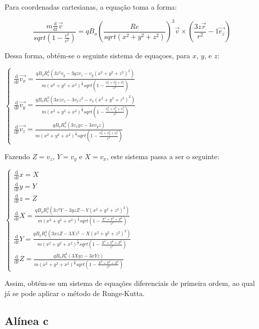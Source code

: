 \documentclass{article}
\begin{document}
\begin{multicols}{2}
Para coordenadas cartesianas, a equação toma a forma:

\begin{equation}
  \frac{m\frac{\mathrm{d} }{\mathrm{d} t}\vec{v}}{sqrt(1-\frac{v^2}{c^2})} = qB_o(\frac{Re}{sqrt(x^2+y^2+z^2)})^3\vec{v}\times(\frac{3z\vec{r}}{r^2}-1\vec{e_z})
\end{equation}

Dessa forma, obtém-se o seguinte sistema de equaçoes, para $x$, $y$, e $z$:

$\left\{\begin{matrix}
\frac{\mathrm{d} }{\mathrm{d} t}\vec{v_x}= \frac{qB_oR_e^3(3z^2v_y-3yzv_z-v_y(x^2+y^2+z^2)^2)}{m(x^2+y^2+x^2)^\frac{5}{2}sqrt(1-\frac{v_x^2+v_y^2+v_z^2}{c^2})}\\
\frac{\mathrm{d} }{\mathrm{d} t}\vec{v_y}= \frac{qB_oR_e^3(3xzv_z-3v_xz^2-v_x(x^2+y^2+z^2)^2)}{m(x^2+y^2+x^2)^\frac{5}{2}sqrt(1-\frac{v_x^2+v_y^2+v_z^2}{c^2})}\\
\frac{\mathrm{d} }{\mathrm{d} t}\vec{v_z}= \frac{qB_oR_e^3(3v_xyz-3xv_yz)}{m(x^2+y^2+x^2)^\frac{5}{2}sqrt(1-\frac{v_x^2+v_y^2+v_z^2}{c^2})}
\end{matrix}\right.$

Fazendo $Z = v_z$, $Y = v_y$ e $X = v_x$, este sistema passa a ser o seguinte:

$\left\{\begin{matrix}
\frac{\mathrm{d} }{\mathrm{d} t}x = X\\
\frac{\mathrm{d} }{\mathrm{d} t}y = Y\\
\frac{\mathrm{d} }{\mathrm{d} t}z = Z\\
\frac{\mathrm{d} }{\mathrm{d} t}X = \frac{qB_oR_e^3(3z^2Y-3yzZ-Y(x^2+y^2+z^2)^2)}{m(x^2+y^2+x^2)^\frac{5}{2}sqrt(1-\frac{X^2+Y^2+Z^2}{c^2})}\\
\frac{\mathrm{d} }{\mathrm{d} t}Y = \frac{qB_oR_e^3(3xzZ-3Xz^2-X(x^2+y^2+z^2)^2)}{m(x^2+y^2+x^2)^\frac{5}{2}sqrt(1-\frac{X^2+Y^2+Z^2}{c^2})}\\
\frac{\mathrm{d} }{\mathrm{d} t}Z = \frac{qB_oR_e^3(3Xyz-3xYz)}{m(x^2+y^2+x^2)^\frac{5}{2}sqrt(1-\frac{X^2+Y^2+Z^2}{c^2})}
\end{matrix}\right.$

Assim, obtém-se um sistema de equações diferenciais de primeira ordem, ao qual já se pode aplicar o método de Runge-Kutta.

\subsection{Alínea c}


\end{multicols}
\end{document}
